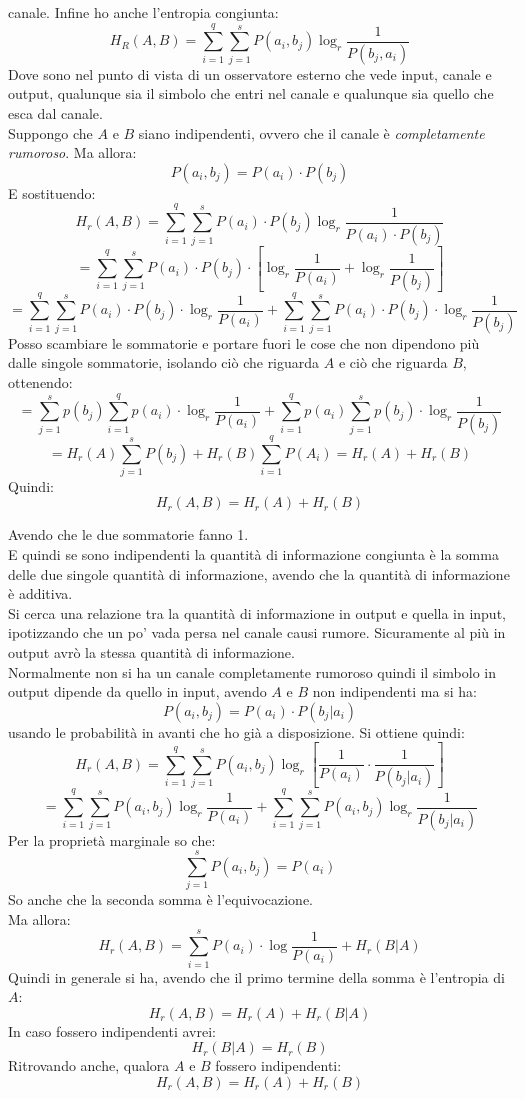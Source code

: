 \documentclass[a4paper,12pt, oneside]{book}
\begin{document}
canale. 
Infine ho anche l'entropia congiunta:
\[H_R(A,B)=\sum_{i=1}^q\sum_{j=1}^s P(a_i,b_j)\log_r\frac{1}{P(b_j,a_i)}\]
Dove sono nel punto di vista di un osservatore esterno che vede input, canale e
output, qualunque sia il simbolo che entri nel canale e qualunque sia quello che
esca dal canale. \\
Suppongo che $A$ e $B$ siano indipendenti, ovvero che il canale è
\textit{completamente rumoroso}. Ma allora: 
\[P(a_i,b_j)=P(a_i)\cdot P(b_j)\]
E sostituendo:
\[H_r(A,B)=\sum_{i=1}^q\sum_{j=1}^s P(a_i)\cdot
  P(b_j)\log_r\frac{1}{P(a_i)\cdot P(b_j)}\]
\[=\sum_{i=1}^q\sum_{j=1}^s P(a_i)\cdot
  P(b_j)\cdot \left[\log_r\frac{1}{P(a_i)}+\log_r\frac{1}{P(b_j)}\right]\]
\[=\sum_{i=1}^q\sum_{j=1}^s P(a_i)\cdot
  P(b_j)\cdot \log_r\frac{1}{P(a_i)}+\sum_{i=1}^q\sum_{j=1}^s P(a_i)\cdot
  P(b_j)\cdot \log_r\frac{1}{P(b_j)}\]
Posso scambiare le sommatorie e portare fuori le cose che non dipendono più
dalle singole sommatorie, isolando ciò che riguarda $A$ e ciò che riguarda $B$,
ottenendo: 
\[=\sum_{j=1}^sp(b_j)\sum_{i=1}^qp(a_i)\cdot
  \log_r\frac{1}{P(a_i)}+\sum_{i=1}^qp(a_i)\sum_{j=1}^sp(b_j)\cdot
  \log_r\frac{1}{P(b_j)}\]
\[=H_r(A)\sum_{j=1}^sP(b_j)+H_r(B)\sum_{i=1}^qP(A_i)=H_r(A)+H_r(B)\]
Quindi:
\[H_r(A,B)=H_r(A)+H_r(B)\]

Avendo che le due sommatorie fanno 1.\\
E quindi se sono indipendenti la quantità di informazione congiunta è la somma
delle due singole quantità di informazione, avendo che la quantità di
informazione è additiva.\\
Si cerca una relazione tra la quantità di informazione in output e quella in
input, ipotizzando che un po' vada persa nel canale causi rumore. Sicuramente al
più in output avrò la stessa quantità di informazione. \\
Normalmente non si ha un canale completamente rumoroso quindi il simbolo in
output dipende da quello in input, avendo $A$ e $B$ non indipendenti ma si ha:
\[P(a_i,b_j)=P(a_i)\cdot P(b_j|a_i)\]
usando le probabilità in avanti che ho già a disposizione. Si ottiene quindi:
\[H_r(A,B)=\sum_{i=1}^q\sum_{j=1}^s P(a_i,b_j)\log_r\left[\frac{1}{P(a_i)}\cdot
    \frac{1}{P(b_j|a_i)}\right]\]
\[=\sum_{i=1}^q\sum_{j=1}^s
  P(a_i,b_j)\log_r\frac{1}{P(a_i)}+\sum_{i=1}^q\sum_{j=1}^s
  P(a_i,b_j)\log_r\frac{1}{P(b_j|a_i)}\]
Per la proprietà marginale so che:
\[\sum_{j=1}^s P(a_i,b_j)=P(a_i)\]
So anche che la seconda somma è l'equivocazione.\\
Ma allora:
\[H_r(A,B)=\sum_{i=1}^s P(a_i)\cdot \log\frac{1}{P(a_i)}+H_r(B|A)\]
Quindi in generale si ha, avendo che il primo termine della somma è l'entropia
di $A$:
\[H_r(A,B)=H_r(A)+H_r(B|A)\]
In caso fossero indipendenti avrei:
\[H_r(B|A)=H_r(B)\]
Ritrovando anche, qualora $A$ e $B$ fossero indipendenti:
\[H_r(A,B)=H_r(A)+H_r(B)\]
\end{document}
